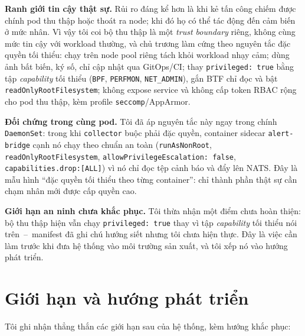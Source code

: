 \textbf{Ranh giới tin cậy thật sự.} Rủi ro đáng kể hơn là khi kẻ tấn công chiếm được
chính pod thu thập hoặc thoát ra node; khi đó họ có thể tác động đến cảm biến ở mức
nhân. Vì vậy tôi coi bộ thu thập là một \emph{trust boundary} riêng, không cùng mức tin
cậy với workload thường, và chủ trương làm cứng theo nguyên tắc đặc quyền tối thiểu:
chạy trên node pool riêng tách khỏi workload nhạy cảm; dùng ảnh bất biến, ký số, chỉ
cập nhật qua GitOps/CI; thay \texttt{privileged: true} bằng tập \emph{capability} tối
thiểu (\texttt{BPF}, \texttt{PERFMON}, \texttt{NET\_ADMIN}), gắn BTF chỉ đọc và bật
\texttt{readOnlyRootFilesystem}; không expose service và không cấp token RBAC rộng cho
pod thu thập, kèm profile \texttt{seccomp}/AppArmor.

\textbf{Đối chứng trong cùng pod.} Tôi đã áp nguyên tắc này ngay trong chính
\texttt{DaemonSet}: trong khi \texttt{collector} buộc phải đặc quyền, container sidecar
\texttt{alert-bridge} cạnh nó chạy theo chuẩn an toàn (\texttt{runAsNonRoot},
\texttt{readOnlyRootFilesystem}, \texttt{allowPrivilegeEscalation: false},
\texttt{capabilities.drop:[ALL]}) vì nó chỉ đọc tệp cảnh báo và đẩy lên NATS. Đây là
mẫu hình ``đặc quyền tối thiểu theo từng container'': chỉ thành phần thật sự cần chạm
nhân mới được cấp quyền cao.

\textbf{Giới hạn an ninh chưa khắc phục.} Tôi thừa nhận một điểm chưa hoàn thiện: bộ thu
thập hiện vẫn chạy \texttt{privileged: true} thay vì tập \emph{capability} tối thiểu nói
trên~--~manifest đã ghi chú hướng siết nhưng tôi chưa hiện thực. Đây là việc cần làm
trước khi đưa hệ thống vào môi trường sản xuất, và tôi xếp nó vào hướng phát triển.

\section{Giới hạn và hướng phát triển}
\label{sec:eval-limit}

Tôi ghi nhận thẳng thắn các giới hạn sau của hệ thống, kèm hướng khắc phục:

